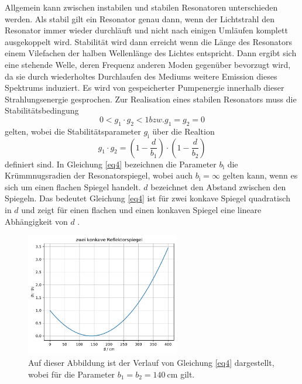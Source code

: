 Allgemein kann zwischen instabilen und stabilen Resonatoren unterschieden werden.
Als stabil gilt ein Resonator genau dann, wenn der Lichtstrahl den Resonator immer
wieder durchläuft und nicht nach einigen Umläufen komplett ausgekoppelt wird.
Stabilität wird dann erreicht wenn die Länge des Resonators einem Vilefachen der 
halben Wellenlänge des Lichtes entspricht. Dann ergibt sich eine stehende Welle,
deren Frequenz anderen Moden gegenüber bevorzugt wird, da sie durch wiederholtes 
Durchlaufen des Mediums weitere Emission dieses Spektrums induziert.
Es wird von gespeicherter Pumpenergie innerhalb dieser Strahlungsenergie gesprochen.
Zur Realisation eines stabilen Resonators muss die Stabilitätsbedingung 
\begin{equation}
    0 < g_1 \cdot g_2 <1 bzw. g_1 = g_2 = 0
    \label{eq3}
\end{equation}
gelten, wobei die Stabilitätsparameter $g_{\text{i}}$ über die Realtion 
\begin{equation}
    g_1 \cdot g_2  = \left( 1- \frac{d}{b_1} \right) \cdot \left(1 - \frac{d}{b_2} \right)
    \label{eq4}
\end{equation}
definiert sind. In Gleichung \eqref{eq4} bezeichnen die Parameter $b_{\text{i}}$ die 
Krümmnugsradien der Resonatorspiegel, wobei auch $b_{\text{i}} = \infty$ gelten kann, 
wenn es sich um einen flachen Spiegel handelt.
$d$ bezeichnet den Abstand zwischen den Spiegeln. 
Das bedeutet Gleichung \eqref{eq4} ist für zwei konkave Spiegel quadratisch in $d$ und 
zeigt für einen flachen und einen konkaven Spiegel eine lineare Abhängigkeit von $d$ \cite{1}.
\begin{figure}
    \centering
    \includegraphics[width=0.6\textwidth]{figure/d_quad.pdf}
    \caption{Auf dieser Abbildung ist der Verlauf von Gleichung \eqref{eq4} 
    dargestellt, wobei für die Parameter $b_{1}=b_{2} = \SI{140}{\centi\meter}$ gilt.}
    \label{abb1}
\end{figure}
